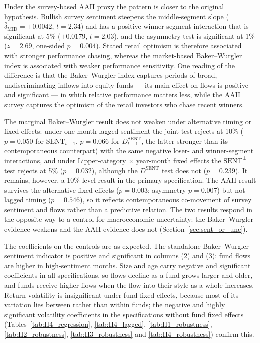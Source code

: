 \documentclass[12pt, oneside]{report}
\begin{document}
Under the survey-based AAII proxy the pattern is closer to the original
hypothesis. Bullish survey sentiment steepens the middle-segment slope
($\hat{\delta}_{\text{MID}} = +0.0042$, $t = 2.34$) and has a positive
winner-segment interaction that is significant at 5\%
($+0.0179$, $t = 2.03$), and the asymmetry test is significant at 1\%
($z = 2.69$, one-sided $p = 0.004$). Stated retail optimism is therefore
associated with stronger performance chasing, whereas the market-based
Baker--Wurgler index is associated with weaker performance sensitivity.
One reading of the difference is that the Baker--Wurgler index captures
periods of broad, undiscriminating inflows into equity funds --- its main
effect on flows is positive and significant --- in which relative
performance matters less, while the AAII survey captures the optimism of
the retail investors who chase recent winners.

The marginal Baker--Wurgler result does not weaken under alternative
timing or fixed effects: under one-month-lagged sentiment the joint test
rejects at 10\% ($p = 0.050$ for $\text{SENT}^{\perp}_{t-1}$,
$p = 0.066$ for $D^{\text{SENT}}_{t-1}$, the latter stronger than its
contemporaneous counterpart) with the same negative loser- and
winner-segment interactions, and under Lipper-category $\times$
year-month fixed effects the $\text{SENT}^{\perp}$ test rejects at 5\%
($p = 0.032$), although the $D^{\text{SENT}}$ test does not ($p = 0.239$).
It remains, however, a 10\%-level result in the primary
specification. The AAII result survives the alternative fixed effects
($p = 0.003$; asymmetry $p = 0.007$) but not lagged timing ($p = 0.546$),
so it reflects contemporaneous co-movement of survey sentiment and flows
rather than a predictive relation. The two results respond in the opposite
way to a control for macroeconomic uncertainty: the Baker--Wurgler
evidence weakens and the AAII evidence does not
(Section~\ref{sec:sent_or_unc}).

The coefficients on the controls are as expected. The standalone
Baker--Wurgler sentiment indicator is positive and significant in
columns (2) and (3): fund flows are higher in high-sentiment months. Size
and age carry negative and significant coefficients in all
specifications, so flows decline as a fund grows larger and older, and
funds receive higher flows when the flow into their style as a whole
increases. Return volatility is insignificant under fund fixed effects,
because most of its variation lies between rather than within funds; the
negative and highly significant volatility coefficients in the
specifications without fund fixed effects (Tables~\ref{tab:H4_regression},
\ref{tab:H4_lagged}, \ref{tab:H1_robustness}, \ref{tab:H2_robustness},
\ref{tab:H3_robustness} and \ref{tab:H4_robustness}) confirm this.
\end{document}
